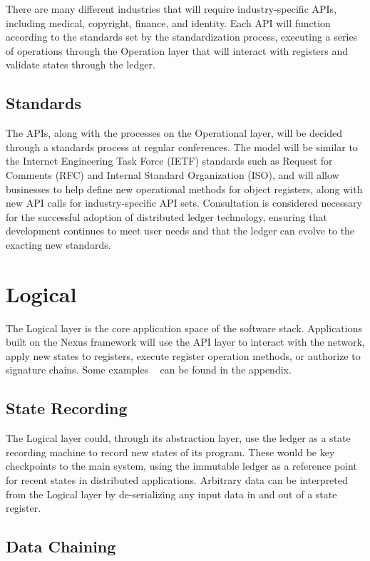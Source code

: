 \documentclass[11pt]{article}
\begin{document}
There are many different industries that will require industry-specific APIs, including medical, copyright, finance, and identity.
Each API will function according to the standards set by the standardization process, executing a series of operations through the Operation layer that will interact with registers and validate states through the ledger.

\subsection{Standards}

The APIs, along with the processes on the Operational layer, will be decided through a standards process at regular conferences.
The model will be similar to the Internet Engineering Task Force (IETF) standards such as Request for Comments (RFC) and Internal Standard Organization (ISO), and will allow businesses to help define new operational methods for object registers, along with new API calls for industry-specific API sets.
Consultation is considered necessary for the successful adoption of distributed ledger technology, ensuring that development continues to meet user needs and that the ledger can evolve to the exacting new standards.


\section{Logical}

The Logical layer is the core application space of the software stack.
Applications built on the Nexus framework will use the API layer to interact with the network, apply new states to registers, execute register operation methods, or authorize to signature chains. Some examples ~ can be found in the appendix.

\subsection{State Recording}

The Logical layer could, through its abstraction layer, use the ledger as a state recording machine to record new states of its program.
These would be key checkpoints to the main system, using the immutable ledger as a reference point for recent states in distributed applications.
Arbitrary data can be interpreted from the Logical layer by de-serializing any input data in and out of a state register.

\subsection{Data Chaining}
\end{document}
